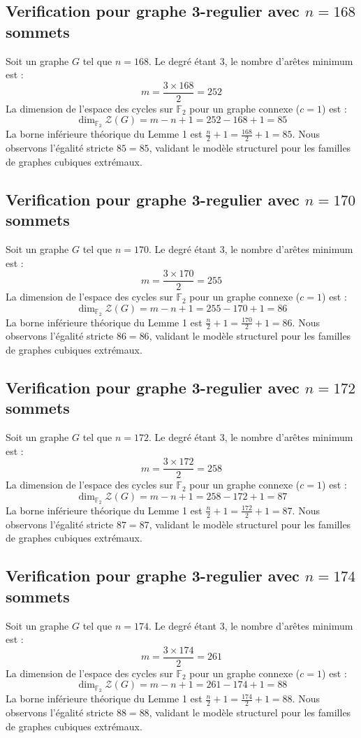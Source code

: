 \documentclass[11pt,a4paper]{article}
\begin{document}
\subsection{Verification pour graphe 3-regulier avec $n=168$ sommets}
Soit un graphe $G$ tel que $n = 168$. Le degré étant 3, le nombre d'arêtes minimum est :
$$ m = \frac{3 \times 168}{2} = 252 $$
La dimension de l'espace des cycles sur $\mathbb{F}_2$ pour un graphe connexe ($c=1$) est :
$$ \dim_{\mathbb{F}_2} \mathcal{Z}(G) = m - n + 1 = 252 - 168 + 1 = 85 $$
La borne inférieure théorique du Lemme 1 est $\frac{n}{2} + 1 = \frac{168}{2} + 1 = 85$.
Nous observons l'égalité stricte $85 = 85$, validant le modèle structurel pour les familles de graphes cubiques extrémaux.

\subsection{Verification pour graphe 3-regulier avec $n=170$ sommets}
Soit un graphe $G$ tel que $n = 170$. Le degré étant 3, le nombre d'arêtes minimum est :
$$ m = \frac{3 \times 170}{2} = 255 $$
La dimension de l'espace des cycles sur $\mathbb{F}_2$ pour un graphe connexe ($c=1$) est :
$$ \dim_{\mathbb{F}_2} \mathcal{Z}(G) = m - n + 1 = 255 - 170 + 1 = 86 $$
La borne inférieure théorique du Lemme 1 est $\frac{n}{2} + 1 = \frac{170}{2} + 1 = 86$.
Nous observons l'égalité stricte $86 = 86$, validant le modèle structurel pour les familles de graphes cubiques extrémaux.

\subsection{Verification pour graphe 3-regulier avec $n=172$ sommets}
Soit un graphe $G$ tel que $n = 172$. Le degré étant 3, le nombre d'arêtes minimum est :
$$ m = \frac{3 \times 172}{2} = 258 $$
La dimension de l'espace des cycles sur $\mathbb{F}_2$ pour un graphe connexe ($c=1$) est :
$$ \dim_{\mathbb{F}_2} \mathcal{Z}(G) = m - n + 1 = 258 - 172 + 1 = 87 $$
La borne inférieure théorique du Lemme 1 est $\frac{n}{2} + 1 = \frac{172}{2} + 1 = 87$.
Nous observons l'égalité stricte $87 = 87$, validant le modèle structurel pour les familles de graphes cubiques extrémaux.

\subsection{Verification pour graphe 3-regulier avec $n=174$ sommets}
Soit un graphe $G$ tel que $n = 174$. Le degré étant 3, le nombre d'arêtes minimum est :
$$ m = \frac{3 \times 174}{2} = 261 $$
La dimension de l'espace des cycles sur $\mathbb{F}_2$ pour un graphe connexe ($c=1$) est :
$$ \dim_{\mathbb{F}_2} \mathcal{Z}(G) = m - n + 1 = 261 - 174 + 1 = 88 $$
La borne inférieure théorique du Lemme 1 est $\frac{n}{2} + 1 = \frac{174}{2} + 1 = 88$.
Nous observons l'égalité stricte $88 = 88$, validant le modèle structurel pour les familles de graphes cubiques extrémaux.
\end{document}
